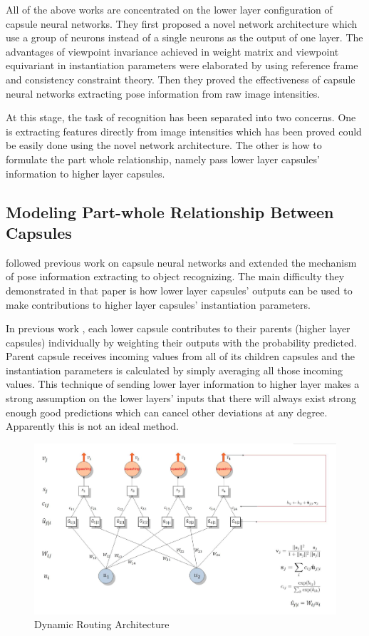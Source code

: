 \documentclass{article} \usepackage{tabularx}
\renewcommand{\citename}{\citet} \renewcommand{\cite}{\citep}
\begin{document}
All of the above works are concentrated on the lower layer
configuration of capsule neural networks. They first proposed a
novel network architecture which use a group of neurons instead
of a single neurons as the output of one layer. The advantages of
viewpoint invariance achieved in weight matrix and viewpoint
equivariant in instantiation parameters were elaborated by using
reference frame and consistency constraint theory. Then they
proved the effectiveness of capsule neural networks extracting
pose information from raw image intensities.

At this stage, the task of recognition has been separated into
two concerns. One is extracting features directly from image
intensities which has been proved could be easily done using the
novel network architecture. The other is how to formulate the
part whole relationship, namely pass lower layer capsules'
information to higher layer capsules.

\subsection{Modeling Part-whole Relationship Between Capsules}
\label{sec:partwhole}

\citename{capsule} followed previous work on capsule neural
networks and extended the mechanism of pose information
extracting to object recognizing. The main difficulty they
demonstrated in that paper is how lower layer capsules' outputs
can be used to make contributions to higher layer capsules'
instantiation parameters.

In previous work \cite{zemel1990traffic,hinton2011transforming},
each lower capsule contributes to their parents (higher layer
capsules) individually by weighting their outputs with the
probability predicted. Parent capsule receives incoming values
from all of its children capsules and the instantiation
parameters is calculated by simply averaging all those incoming
values. This technique of sending lower layer information to
higher layer makes a strong assumption on the lower layers'
inputs that there will always exist strong enough good
predictions which can cancel other deviations at any degree.
Apparently this is not an ideal method.

\begin{figure}
  \centering
  \includegraphics[scale=0.3]{images/capsnet_recursive.png}
  \caption{Dynamic Routing Architecture}
  \label{fig:routing}
\end{figure}
\end{document}
